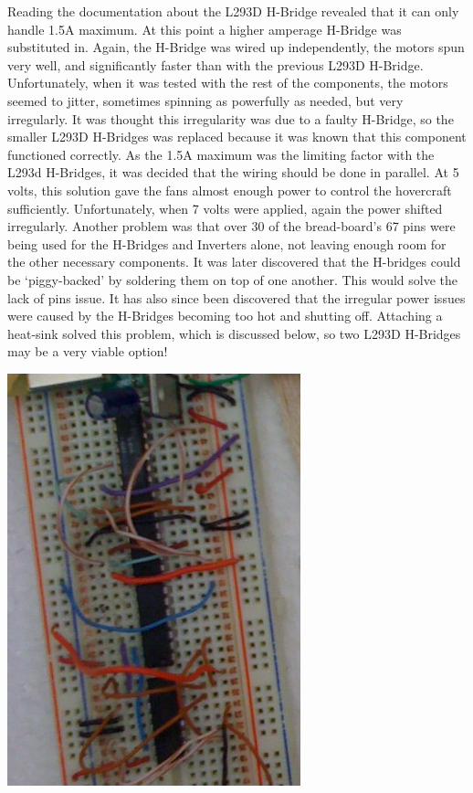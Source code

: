 \begin{minipage}{6.5in}
\begin{minipage}{6.5in}
Reading the documentation about the L293D H-Bridge revealed that it can only handle 1.5A maximum. At this point a higher amperage H-Bridge was substituted in. Again, the H-Bridge was wired up independently, the motors spun very well, and significantly faster than with the previous L293D H-Bridge. Unfortunately, when it was tested with the rest of the components, the motors seemed to jitter, sometimes spinning as powerfully as needed, but very irregularly. It was thought this irregularity was due to a faulty H-Bridge, so the smaller L293D H-Bridges was replaced because it was known that this component functioned correctly. As the 1.5A maximum was the limiting factor with the L293d H-Bridges, it was decided that the wiring should be done in parallel. At 5 volts, this solution gave the fans almost enough power to control the hovercraft sufficiently. Unfortunately, when 7 volts were applied, again the power shifted irregularly. Another problem was that over 30 of the bread-board's 67 pins were being used for the H-Bridges and Inverters alone, not leaving enough room for the other necessary components. It was later discovered that the H-bridges could be `piggy-backed' by soldering them on top of one another. This would solve the lack of pins issue. It has also since been discovered that the irregular power issues were caused by the H-Bridges becoming too hot and shutting off. Attaching a heat-sink solved this problem, which is discussed below, so two L293D H-Bridges may be a very viable option!

\begin{minipage}{6.5in}
\begin{center}
  \includegraphics[width=85mm]{imageSources/designProblemsHBridge1.png}
\end{center}
\label{HbridgeWiring}
\end{minipage}


\end{minipage}
\end{minipage}
